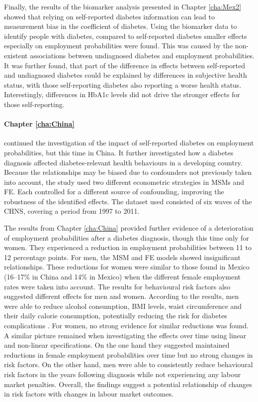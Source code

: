 Finally, the results of the biomarker analysis presented in Chapter \ref{cha:Mex2} showed that relying on self-reported diabetes information can lead to measurement bias in the coefficient of diabetes. Using the biomarker data to identify people with diabetes, compared to self-reported diabetes smaller effects especially on employment probabilities were found. This was caused by the non-existent associations between undiagnosed diabetes and employment probabilities. It was further found, that part of the difference in effects between self-reported and undiagnosed diabetes could be explained by differences in subjective health status, with those self-reporting diabetes also reporting a worse health status. Interestingly, differences in \ac{HbA1c} levels did not drive the stronger effects for those self-reporting. %


\paragraph{Chapter \ref{cha:China}} continued the investigation of the impact of self-reported diabetes on employment probabilities, but this time in China. It further investigated how a diabetes diagnosis affected diabetes-relevant health behaviours in a developing country. Because the relationships may be biased due to confounders not previously taken into account, the study used two different econometric strategies in \acp{MSM} and \ac{FE}. Each controlled for a different source of confounding, improving the robustness of the identified effects. The dataset used consisted of six waves of the \ac{CHNS}, covering a period from 1997 to 2011.

The results from Chapter \ref{cha:China} provided further evidence of a deterioration of employment probabilities after a diabetes diagnosis, though this time only for women. They experienced a reduction in employment probabilities between 11 to 12 percentage points. For men, the \ac{MSM} and \ac{FE} models showed insignificant relationships. These reductions for women were similar to those found in Mexico (16--17\% in China and 14\% in Mexico) when the different female employment rates were taken into account. The results for behavioural risk factors also suggested different effects for men and women. According to the results, men were able to reduce alcohol consumption, \ac{BMI} levels, waist circumference and their daily calorie consumption, potentially reducing the risk for diabetes complications \parencite{Wilding2014}. For women, no strong evidence for similar reductions was found. A similar picture remained when investigating the effects over time using linear and non-linear specifications. On the one hand they suggested maintained reductions in female employment probabilities over time but no strong changes in risk factors. On the other hand, men were able to consistently reduce behavioural risk factors in the years following diagnosis while not experiencing any labour market penalties. Overall, the findings suggest a potential relationship of changes in risk factors with changes in labour market outcomes.

